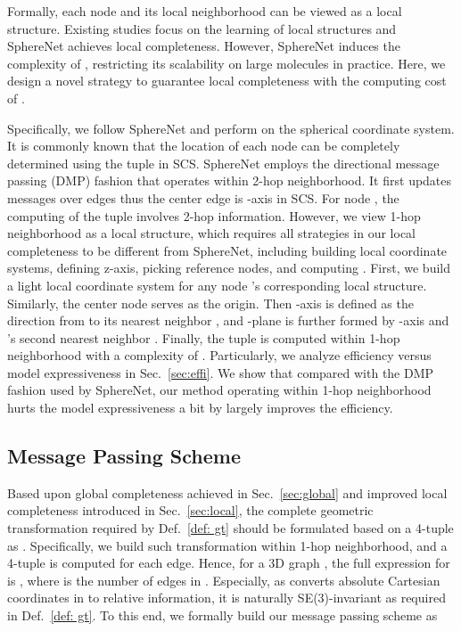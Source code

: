 \documentclass{article}
\begin{document}
Formally, each node and its local neighborhood can be viewed as a local structure.
Existing studies focus on the learning of local structures and 
SphereNet achieves local completeness.
However, SphereNet induces the complexity of ,
restricting its scalability on large molecules in practice.
Here, we design a novel strategy to guarantee local completeness
with the computing cost of .

Specifically, 
we follow SphereNet and perform on the spherical coordinate system.
It is commonly known that the location of each node can be completely determined using the tuple  in SCS.
SphereNet employs the directional message passing (DMP) fashion that operates within 2-hop neighborhood.
It first updates messages over edges thus the center edge is
-axis in SCS. For node , the computing of the tuple  
involves 2-hop information.
However, we view 1-hop neighborhood as a local structure, which requires all strategies in our local completeness to be different from SphereNet,
including building local coordinate systems, defining z-axis, picking reference nodes, and computing .
First, we build a light local coordinate system for any node 's corresponding local structure.
Similarly, the center node  serves as the origin.
Then -axis is defined as the direction from  to its nearest neighbor ,
and -plane is further formed by -axis and 's second nearest neighbor .
Finally, the tuple  is computed within 1-hop neighborhood with a complexity of .
Particularly, we analyze efficiency versus model expressiveness in Sec.~\ref{sec:effi}. We show that compared with the DMP fashion used by SphereNet,
our method operating within 1-hop neighborhood
hurts the model expressiveness a bit by largely
improves the efficiency. 


\subsection{Message Passing Scheme} \label{sec:mp}
Based upon global completeness achieved in Sec.~\ref{sec:global}
and improved local completeness introduced in Sec.~\ref{sec:local},
the complete geometric transformation  required by
Def.~\ref{def: gt} should be formulated based on a 4-tuple as 
.
Specifically, we build such transformation within 1-hop neighborhood,
and a 4-tuple is computed for each edge.
Hence, for a 3D graph ,
the full expression for  is
,
where  is the number of edges in .
Especially, as  converts absolute Cartesian coordinates in 
to relative information, it is naturally SE(3)-invariant
as required in Def.~\ref{def: gt}.
To this end, we formally build our message passing scheme as
\end{document}
